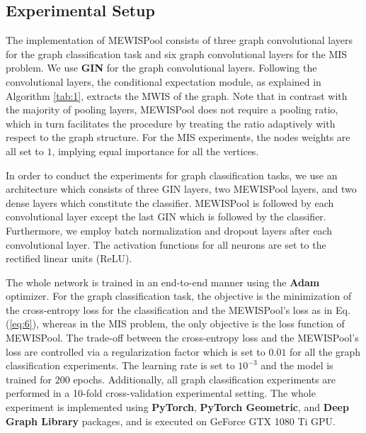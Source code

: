 \documentclass{article}
\begin{document}
\subsection{Experimental Setup}\label{subsec:exp-setup}
The implementation of MEWISPool consists of three graph convolutional layers for the graph classification task and six graph convolutional layers for the MIS problem. We use \textbf{GIN}\cite{gin} for the graph convolutional layers. Following the convolutional layers, the conditional expectation module, as explained in Algorithm \ref{tab:1}, extracts the MWIS of the graph. Note that in contrast with the majority of pooling layers, MEWISPool does not require a pooling ratio, which in turn facilitates the procedure by treating the ratio adaptively with respect to the graph structure. For the MIS experiments, the nodes weights are all set to $1$, implying equal importance for all the vertices.

In order to conduct the experiments for graph classification tasks, we use an architecture which consists of three GIN layers, two MEWISPool layers, and two dense layers which constitute the classifier. MEWISPool is followed by each convolutional layer except the last GIN which is followed by the classifier. Furthermore, we employ batch normalization\cite{batchnorm} and dropout\cite{dropout} layers after each convolutional layer. The activation functions for all neurons are set to the rectified linear units (ReLU).

The whole network is trained in an end-to-end manner using the \textbf{Adam}\cite{adam} optimizer. For the graph classification task, the objective is the minimization of the cross-entropy loss for the classification and the MEWISPool's loss as in Eq.(\ref{eq:6}), whereas in the MIS problem, the only objective is the loss function of MEWISPool. The trade-off between the cross-entropy loss and the MEWISPool's loss are controlled via a regularization factor which is set to $0.01$ for all the graph classification experiments. The learning rate is set to $10^{-3}$ and the model is trained for $200$ epochs. Additionally, all graph classification experiments are performed in a 10-fold cross-validation experimental setting. The whole experiment is implemented using \textbf{PyTorch}\cite{pytorch}, \textbf{PyTorch Geometric}\cite{torchgeom}, and \textbf{Deep Graph Library}\cite{dgl} packages, and is executed on GeForce GTX 1080 Ti GPU.
\end{document}
